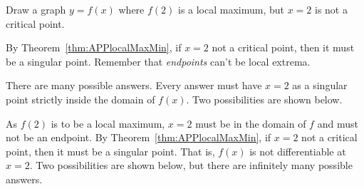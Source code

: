 \begin{question}
Draw a graph $y=f(x)$ where $f(2)$ is a local maximum, but $x=2$ is not a critical point.
\end{question}
\begin{hint}
By Theorem~\ref*{thm:APPlocalMaxMin},
if $x=2$ not a critical point, then it must be a singular point. Remember that \emph{endpoints} can't be local extrema.
\end{hint}
\begin{answer}
There are many possible answers. Every answer must have $x=2$ as a singular point strictly inside the domain of $f(x)$. Two possibilities are shown below.
\begin{center}
\hspace{2cm}
\end{center}
\end{answer}
\begin{solution}
As $f(2)$ is to be a local maximum, $x=2$ must be in the domain of $f$ and must not be an endpoint.
By Theorem~\ref*{thm:APPlocalMaxMin}, if $x=2$ not a critical point, then it must be a singular point. That is, $f(x)$ is not differentiable at $x=2$. Two possibilities are shown below, but there are infinitely many possible answers.
\begin{center}
\hspace{2cm}
\end{center}
\end{solution}




